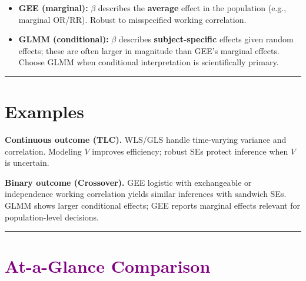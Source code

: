 \documentclass[
  letterpaper,
  DIV=11,
  numbers=noendperiod]{scrreprt}
\providecommand{\tightlist}{%
  \setlength{\itemsep}{0pt}\setlength{\parskip}{0pt}}\usepackage{longtable,booktabs,array}
\begin{document}
\begin{itemize}
\tightlist
\item
  \textbf{GEE (marginal):} \(\beta\) describes the \textbf{average}
  effect in the population (e.g., marginal OR/RR). Robust to
  misspecified working correlation.
\item
  \textbf{GLMM (conditional):} \(\beta\) describes
  \textbf{subject-specific} effects given random effects; these are
  often larger in magnitude than GEE's marginal effects. Choose GLMM
  when conditional interpretation is scientifically primary.
\end{itemize}

\begin{center}\rule{0.5\linewidth}{0.5pt}\end{center}

\hypertarget{examples}{%
\section*{Examples}\label{examples}}


\textbf{Continuous outcome (TLC).} WLS/GLS handle time-varying variance
and correlation. Modeling \(V\) improves efficiency; robust SEs protect
inference when \(V\) is uncertain.

\textbf{Binary outcome (Crossover).} GEE logistic with exchangeable or
independence working correlation yields similar inferences with sandwich
SEs. GLMM shows larger conditional effects; GEE reports marginal effects
relevant for population-level decisions.

\begin{center}\rule{0.5\linewidth}{0.5pt}\end{center}

\hypertarget{section-20}{%
\section*{\texorpdfstring{\textcolor{purple}{At-a-Glance Comparison}}{}}\label{section-20}}

\markright{\textcolor{purple}{At-a-Glance Comparison}}
\end{document}

